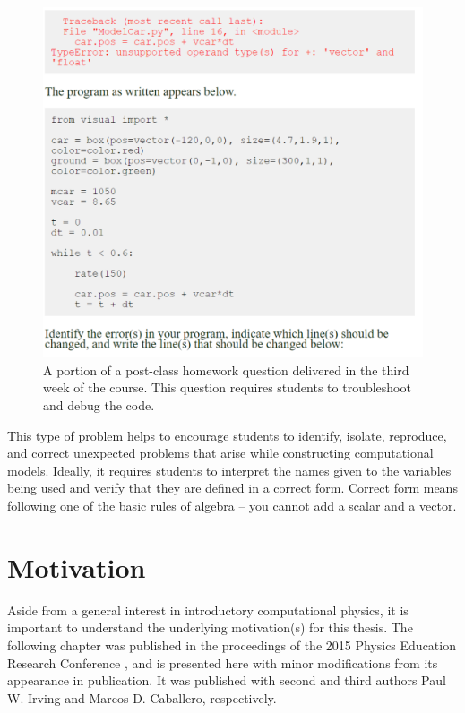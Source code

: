 \documentclass{msuphddissertation}
\begin{document}
\begin{doublespace}
\begin{figure}[ht]\centering
\includegraphics[scale=0.50]{images/CH3PostClassHomework.pdf}
\caption{A portion of a post-class homework question delivered in the third week of the course.  This question requires students to troubleshoot and debug the code.}\label{CH3:PostClassHomework}
\end{figure}

This type of problem helps to encourage students to identify, isolate, reproduce, and correct unexpected problems that arise while constructing computational models.  Ideally, it requires students to interpret the names given to the variables being used and verify that they are defined in a correct form.  Correct form means following one of the basic rules of algebra -- you cannot add a scalar and a vector.

%
%

\chapter{Motivation}\label{CH4:Motivation}

Aside from a general interest in introductory computational physics, it is important to understand the underlying motivation(s) for this thesis.  The following chapter was published in the proceedings of the 2015 Physics Education Research Conference \cite{AAPT2016}, and is presented here with minor modifications from its appearance in publication. It was published with second and third authors Paul W. Irving and Marcos D. Caballero, respectively.


\end{doublespace}
\end{document}
